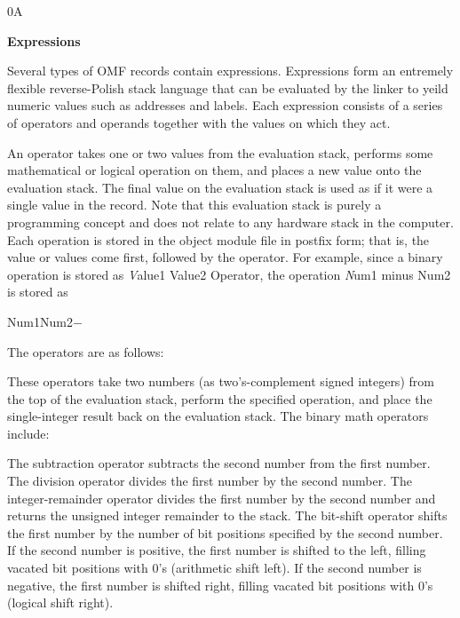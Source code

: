 \smallskip

\bodybody
{ 0A}

{\bf Expressions}

\description
Several types of OMF records contain expressions. Expressions form an
entremely flexible reverse-Polish stack language that can be evaluated
by the linker to yeild numeric values such as addresses and labels. Each
expression consists of a series of operators and operands together with
the values on which they act.

\description
An operator takes one or two values from the evaluation stack, performs some
mathematical or logical operation on them, and places a new value onto the
evaluation stack. The final value on the evaluation stack is used as if it
were a single value in the record. Note that this evaluation stack is
purely a programming concept and does not relate to any hardware stack in
the computer. Each operation is stored in the object module file in postfix
form; that is, the value or values come first, followed by the operator.
For example, since a binary operation is stored as {\textsl Value1 Value2
Operator}, the operation {\textsl Num1 minus Num2} is stored as

\description
{\text Num1Num2$-$}

\description
The operators are as follows:

 These operators take two numbers (as
two's-complement signed integers) from the top of the evaluation stack,
perform the specified operation, and place the single-integer result back
on the evaluation stack. The binary math operators include:

\medskip\begingroup\parskip=0pt
\endgroup

\notenote
The subtraction operator subtracts the second number from the first number.
The division operator divides the first number by the second number. The
integer-remainder operator divides the first number by the second number
and returns the unsigned integer remainder to the stack. The bit-shift
operator shifts the first number by the number of bit positions specified
by the second number. If the second number is positive, the first number
is shifted to the left, filling vacated bit positions with 0's (arithmetic
shift left). If the second number is negative, the first number is shifted
right, filling vacated bit positions with 0's (logical shift right).

